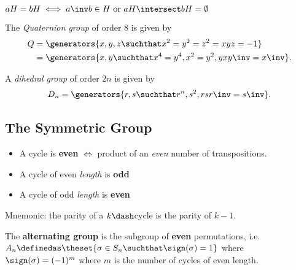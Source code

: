 \begin{theorem}

\(aH = bH \iff a\inv b \in H \text{ or } aH \intersect bH = \emptyset\)

\end{theorem}

\begin{definition}

The \emph{Quaternion group} of order 8 is given by \begin{align*}
Q &= \generators{x,y,z \suchthat x^2 = y^2 = z^2 = xyz = -1} \\
  &= \generators{x, y \suchthat  x^4 = y^4, x^2 = y^2, yxy\inv = x\inv}
.\end{align*}

\end{definition}

\begin{definition}

A \emph{dihedral group} of order \(2n\) is given by \begin{align*}
D_n = \generators{r, s \suchthat r^n, s^2, rsr\inv = s\inv }
.\end{align*}

\end{definition}

\hypertarget{the-symmetric-group}{%
\subsection{The Symmetric Group}\label{the-symmetric-group}}

\begin{definition}

\begin{itemize}
\item
  A cycle is \textbf{even} \(\iff\) product of an \emph{even} number of
  transpositions.
\item
  A cycle of even \emph{length} is \textbf{odd}
\item
  A cycle of odd \emph{length} is \textbf{even}
\end{itemize}

\end{definition}

Mnemonic: the parity of a \(k\dash\)cycle is the parity of \(k-1\).

\begin{definition}

The \textbf{alternating group} is the subgroup of \textbf{even}
permutations, i.e.
\(A_n \definedas \theset{\sigma \in S_n \suchthat \sign(\sigma) = 1}\)
where \(\sign(\sigma) = (-1)^{m}\) where \(m\) is the number of cycles
of even length.

\end{definition}

